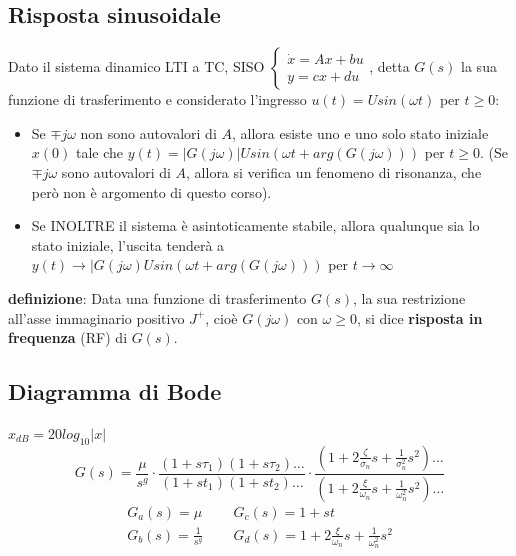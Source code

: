\begin{landscape}
    \subsection*{Risposta sinusoidale}
    Dato il sistema dinamico LTI a TC, SISO $\begin{cases}
        \dot{x} = Ax +bu\\ 
        y = cx +du
    \end{cases}$, detta $G(s)$ la sua funzione di trasferimento e considerato l'ingresso $u(t) = U sin(\omega t)$ per $t\geq 0$:
    \begin{itemize}
        \item Se $\mp j \omega$ non sono autovalori di $A$, allora esiste uno e uno solo stato iniziale $x(0)$ tale che $y(t) = |G(j \omega)| U sin(\omega t + arg(G(j \omega)))$ per $t\geq 0$. (Se $\mp j \omega$ sono autovalori di $A$, allora si verifica un fenomeno di risonanza, che però non è argomento di questo corso).
        \item Se INOLTRE il sistema è asintoticamente stabile, allora qualunque sia lo stato iniziale, l'uscita  tenderà a $y(t) \rightarrow |G(j \omega) U sin( \omega t + arg(G(j \omega)))$ per $t \rightarrow  \infty$
    \end{itemize}
    \textbf{definizione}:  Data una funzione di trasferimento $G(s)$, la sua restrizione all'asse immaginario positivo $J^+$, cioè $G(j \omega)$ con $\omega \geq 0$, si dice \textbf{risposta in frequenza} (RF) di $G(s)$.
    \subsection*{Diagramma di Bode}
    $x_{dB} = 20 log_{10}|x|$\newline
    \[
        G(s) = \frac{\mu}{s^g} \cdot \frac{(1 + s \tau_1)(1 + s \tau_2)\dots}{(1 + s t_1)(1 + s t_2)\dots} \cdot \frac{(1 + 2 \frac{\zeta}{\sigma_n}s + \frac{1}{\sigma_n^2}s^2)\dots}{(1 + 2 \frac{\xi}{\omega_n} s + \frac{1}{\omega_n^2}s^2)\dots}
    \]
    \[
        \begin{matrix}
            G_a(s) = \mu & \;\; & G_c(s) = 1+ s t\\
            G_b(s) = \frac{1}{s^g} & \;\; & G_d(s) = 1 + 2 \frac{\xi}{\omega_n}s + \frac{1}{\omega_n^2}s^2
        \end{matrix}
    \]

\end{landscape}
